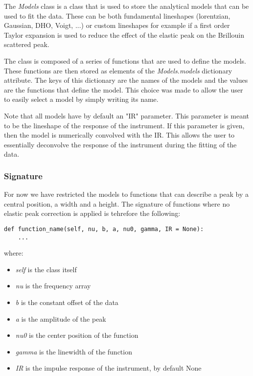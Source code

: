 The \textit{Models} class is a class that is used to store the analytical models that can be used to fit the data. These can be both fundamental lineshapes (lorentzian, Gaussian, DHO, Voigt, ...) or custom lineshapes for example if a first order Taylor expansion is used to reduce the effect of the elastic peak on the Brillouin scattered peak. 

The class is composed of a series of functions that are used to define the models. These functions are then stored as elements of the \textit{Models.models} dictionary attribute. The keys of this dictionary are the names of the models and the values are the functions that define the model. This choice was made to allow the user to easily select a model by simply writing its name. 

Note that all models have by default an "IR" parameter. This parameter is meant to be the lineshape of the response of the instrument. If this parameter is given, then the model is numerically convolved with the IR. This allows the user to essentially deconvolve the response of the instrument during the fitting of the data.

\subsubsection{Signature}

For now we have restricted the models to functions that can describe a peak by a central position, a width and a height. The signature of functions where no elastic peak correction is applied is tehrefore the following:
\begin{lstlisting}
def function_name(self, nu, b, a, nu0, gamma, IR = None):
    ...
\end{lstlisting}

where:
\begin{itemize}
    \item \textit{self} is the class itself
    \item \textit{nu} is the frequency array
    \item \textit{b} is the constant offset of the data
    \item \textit{a} is the amplitude of the peak
    \item \textit{nu0} is the center position of the function
    \item \textit{gamma} is the linewidth of the function
    \item \textit{IR} is the impulse response of the instrument, by default None
\end{itemize}


